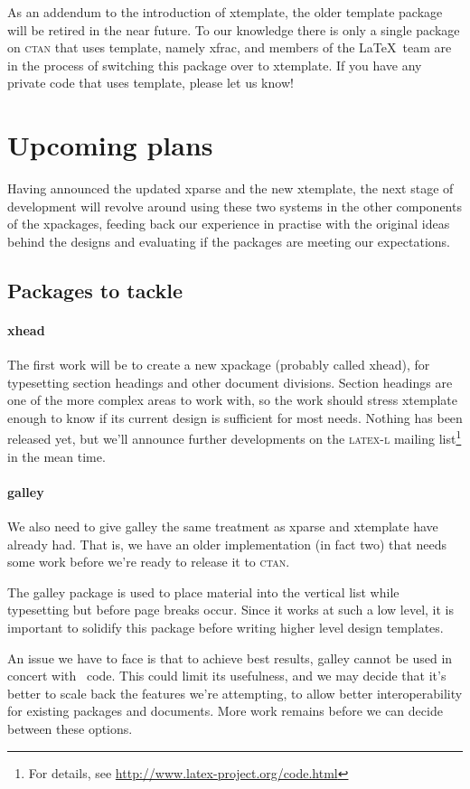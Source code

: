 \documentclass{ltnews}
\begin{document}
As an addendum to the introduction of \textsf{xtemplate}, the older \textsf{template} package will be retired in the near future. To our knowledge there is only a single package on \textsc{ctan} that uses \textsf{template}, namely \textsf{xfrac}, and members of the \LaTeX\ team are in the process of switching this package over to \textsf{xtemplate}. If you have any private code that uses \textsf{template}, please let us know!


\section{Upcoming plans}

Having announced the updated \textsf{xparse} and the new \textsf{xtemplate}, the next stage of development will revolve around using these two systems in the other components of the \textsf{xpackages}, feeding back our experience in practise with the original ideas behind the designs and evaluating if the packages are meeting our expectations.

\subsection{Packages to tackle}

\paragraph{\textsf{xhead}}
The first work will be to create a new \textsf{xpackage} (probably called \textsf{xhead}), for typesetting section headings and other document divisions.
Section headings are one of the more complex areas to work with, so
the work should stress \textsf{xtemplate} enough to know if its
current design is sufficient for most needs.  Nothing has been
released yet, but we'll announce further developments on the
\textsc{latex-l} mailing
list\footnote{For details, see
  \url{http://www.latex-project.org/code.html}} in the
mean time.


\paragraph{\textsf{galley}}
We also need to give \textsf{galley} the same treatment as
\textsf{xparse} and \textsf{xtemplate} have already had. That is, we have an
older implementation (in fact two) that needs some work before we're ready to release it to \textsc{ctan}.

The \textsf{galley} package is used to place material into the
vertical list while typesetting but before page breaks occur. Since it
works at such a low level, it is important to solidify this package
before writing higher level design templates.

An issue we have to face is that to achieve best results,
\textsf{galley} cannot be used in concert with \LaTeXe\ code.  This
could limit its usefulness, and we may decide that it's better to
scale back the features we're attempting, to allow better
interoperability for existing packages and documents.  More work
remains before we can decide between these options.
\end{document}
